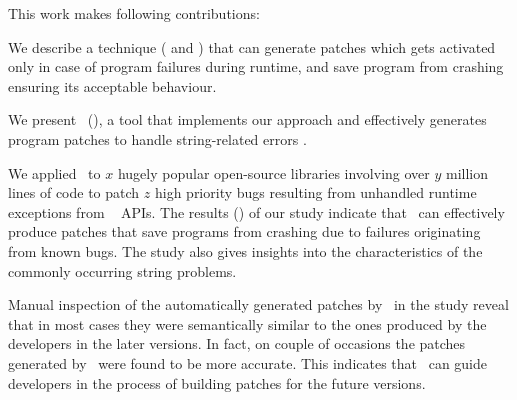 This work makes following contributions:
\begin{mylist}
\item We describe a technique ( and ) that
can generate patches which gets activated only in case of program failures
during runtime, and save program from crashing  ensuring its acceptable behaviour.


\item We present \tool\ (), a tool that implements our approach
and effectively generates program patches to handle string-related errors
\cite{}.

\item We applied \tool\ to $x$ hugely popular open-source libraries involving 
over $y$ million lines of code to patch $z$ high priority bugs resulting from
unhandled runtime exceptions from \java\  APIs.
The results () of our study indicate that \tool\ can effectively produce
patches that save programs from crashing due to failures originating from known
bugs. The study also gives insights into the characteristics of the commonly
occurring string problems.

\item Manual inspection of the automatically generated patches by \tool\ in the
study reveal that in most cases they were semantically similar to the ones
produced by the developers in the later versions. In fact, on couple of
occasions the patches generated by \tool\ were found to be more accurate. This
indicates that \tool\ can guide developers in the process of building patches
for the future versions.
\end{mylist}










